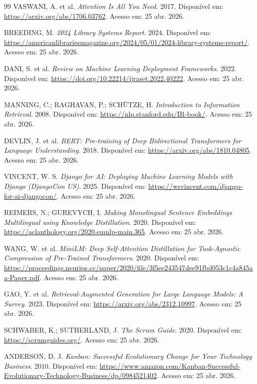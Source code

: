 \documentclass[monografia,abnt]{inf-ufg-modificado}
\begin{document}
\begin{thebibliography}{99}
VASWANI, A. et al. \textit{Attention Is All You Need}. 2017. Disponível em: \url{https://arxiv.org/abs/1706.03762}. Acesso em: 25 abr. 2026.

BREEDING, M. \textit{2024 Library Systems Report}. 2024. Disponível em: \url{https://americanlibrariesmagazine.org/2024/05/01/2024-library-systems-report/}. Acesso em: 25 abr. 2026.

DANI, S. et al. \textit{Review on Machine Learning Deployment Frameworks}. 2022. Disponível em: \url{https://doi.org/10.22214/ijraset.2022.40222}. Acesso em: 25 abr. 2026.

MANNING, C.; RAGHAVAN, P.; SCHÜTZE, H. \textit{Introduction to Information Retrieval}. 2008. Disponível em: \url{https://nlp.stanford.edu/IR-book/}. Acesso em: 25 abr. 2026.

DEVLIN, J. et al. \textit{BERT: Pre-training of Deep Bidirectional Transformers for Language Understanding}. 2018. Disponível em: \url{https://arxiv.org/abs/1810.04805}. Acesso em: 25 abr. 2026.

VINCENT, W. S. \textit{Django for AI: Deploying Machine Learning Models with Django (DjangoCon US)}. 2025. Disponível em: \url{https://wsvincent.com/django-for-ai-djangocon/}. Acesso em: 25 abr. 2026.

REIMERS, N.; GUREVYCH, I. \textit{Making Monolingual Sentence Embeddings Multilingual using Knowledge Distillation}. 2020. Disponível em: \url{https://aclanthology.org/2020.emnlp-main.365}. Acesso em: 25 abr. 2026.

WANG, W. et al. \textit{MiniLM: Deep Self-Attention Distillation for Task-Agnostic Compression of Pre-Trained Transformers}. 2020. Disponível em: \url{https://proceedings.neurips.cc/paper/2020/file/3f5ee243547dee91fbd053c1c4a845aa-Paper.pdf}. Acesso em: 25 abr. 2026.

GAO, Y. et al. \textit{Retrieval-Augmented Generation for Large Language Models: A Survey}. 2023. Disponível em: \url{https://arxiv.org/abs/2312.10997}. Acesso em: 25 abr. 2026.

SCHWABER, K.; SUTHERLAND, J. \textit{The Scrum Guide}. 2020. Disponível em: \url{https://scrumguides.org/}. Acesso em: 25 abr. 2026.

ANDERSON, D. J. \textit{Kanban: Successful Evolutionary Change for Your Technology Business}. 2010. Disponível em: \url{https://www.amazon.com/Kanban-Successful-Evolutionary-Technology-Business/dp/0984521402}. Acesso em: 25 abr. 2026.


\end{thebibliography}
\end{document}
